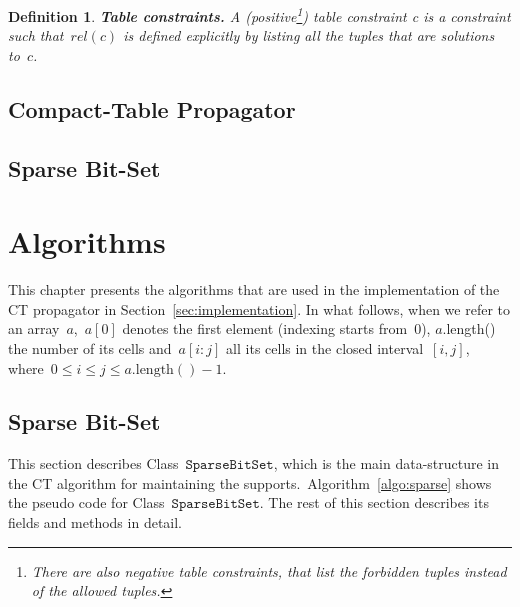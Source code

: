 \documentclass[a4paper,11pt]{article}
\newtheorem{definition}{Definition}
\newcommand{\Chapref}[1]{Section~\ref{#1}}
\newcommand{\Algoref}[1]{Algorithm~\ref{#1}}
\newcommand{\SparseBitSet}{\texttt{SparseBitSet}}
\newcommand{\function}[1]{\mathrm{#1}}
\numberwithin{equation}{section}
\begin{document}
\begin{definition}
  \textbf{Table constraints.} A
  (positive\footnote{There are also negative table constraints, that list the forbidden tuples instead of the allowed tuples.})
  \emph{table constraint c} is a
  constraint such that~$rel(c)$ is defined explicitly by listing all the
  tuples that are solutions to~$c$.
\end{definition}

\subsection{Compact-Table Propagator}
\label{bg:ct}

\subsection{Sparse Bit-Set}
\label{bg:sbs}

\section{Algorithms}
\label{algorithms}


This chapter presents the algorithms that are used in the implementation of the
CT propagator in \Chapref{sec:implementation}. In what follows, when we refer to
an array~$a$,~$a[0]$ denotes the first element (indexing starts from~$0$),
$a$.length() the number of its cells and~$a[i:j]$ all its cells in the closed
interval~$[i,j]$, where~$0 \leq i \leq j \leq a.\function{length}() - 1$.

\subsection{Sparse Bit-Set}
\label{sec:sbs}
This section describes Class~$\SparseBitSet$, which is the main data-structure
in the CT algorithm for maintaining the supports.~\Algoref{algo:sparse} shows the
pseudo code for Class~$\SparseBitSet$. The rest of this section describes its
fields and methods in detail.
\end{document}
